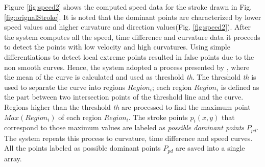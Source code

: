 \documentclass{article}%
\begin{document}
 Figure \ref{fig:speed2} shows the computed speed data for the stroke drawn in Fig. \ref{fig:orignalStroke}. %
 It is noted that the dominant points are characterized by lower speed values and higher curvature and direction values(Fig. \ref{fig:speed2}). %
After the system computes all the speed, time difference and curvature data it proceeds to detect the points with low velocity and high curvatures. Using simple differentiations to detect local extreme points resulted in false points due to the non smooth curves. Hence, the system adopted a process presented by \cite{earlyprocess}, where the mean of the curve is calculated and used as threshold \textit{th}. The threshold \textit{th} is used to separate the curve into regions  $Region_i$; each region $Region_i$ is defined as the part between two intersection points of the threshold line and the curve. Regions higher than the threshold \textit{th} are processed to find the maximum point $Max(Region_i)$ of each region $Region_i$. The stroke points $p_i(x,y)$ that correspond to those maximum values are labeled as \textit{possible dominant points} $P_{pd}$. The system repeats this process to curvature, time difference and speed curves. All the points labeled as possible dominant points $P_{pd}$ are saved into a single array. %
\end{document}
